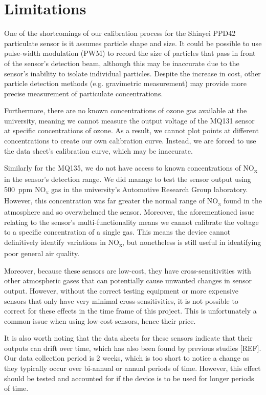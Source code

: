 \documentclass[11pt]{report}
\begin{document}
\section{Limitations}

One of the shortcomings of our calibration process for the Shinyei PPD42 particulate sensor is it assumes particle shape and size. It could be possible to use pulse-width modulation (PWM) to record the size of particles that pass in front of the sensor's detection beam, although this may be inaccurate due to the sensor's inability to isolate individual particles. Despite the increase in cost, other particle detection methods (e.g. gravimetric measurement) may provide more precise measurement of particulate concentrations.

Furthermore, there are no known concentrations of ozone gas available at the university, meaning we cannot measure the output voltage of the MQ131 sensor at specific concentrations of ozone. As a result, we cannot plot points at different concentrations to create our own calibration curve. Instead, we are forced to use the data sheet's calibration curve, which may be inaccurate.

Similarly for the MQ135, we do not have access to known concentrations of NO\textsubscript{x} in the sensor's detection range. We did manage to test the sensor output using 500~ppm NO\textsubscript{x} gas in the university's Automotive Research Group laboratory. However, this concentration was far greater the normal range of NO\textsubscript{x} found in the atmosphere and so overwhelmed the sensor. Moreover, the aforementioned issue relating to the sensor's multi-functionality means we cannot calibrate the voltage to a specific concentration of a single gas. This means the device cannot definitively identify variations in NO\textsubscript{x}, but nonetheless is still useful in identifying poor general air quality.


Moreover, because these sensors are low-cost, they have cross-sensitivities with other atmospheric gases that can potentially cause unwanted changes in sensor output. However, without the correct testing equipment or more expensive sensors that only have very minimal cross-sensitivities, it is not possible to correct for these effects in the time frame of this project. This is unfortunately a common issue when using low-cost sensors, hence their price.

It is also worth noting that the data sheets for these sensors indicate that their outputs can drift over time, which has also been found by previous studies [REF]. Our data collection period is 2 weeks, which is too short to notice a change as they typically occur over bi-annual or annual periods of time. However, this effect should be tested and accounted for if the device is to be used for longer periods of time.
\end{document}
